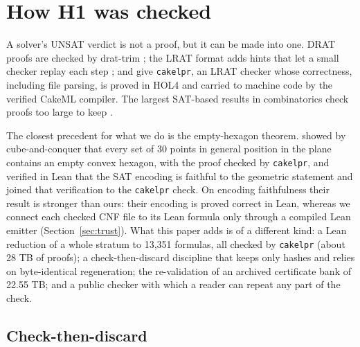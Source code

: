 \documentclass{anvil-paper}
\newcommand{\cakelpr}{\texttt{cake\textunderscore lpr}}
\theoremstyle{definition}
\begin{document}
\section{How H1 was checked}\label{sec:h1}

A solver's UNSAT verdict is not a proof, but it can be made into one. DRAT proofs are checked by drat-trim \citep{wetzler2014drat}; the LRAT format adds hints that let a small checker replay each step \citep{cruzfilipe2017lrat}; and \citet{tan2021cakelpr} give \cakelpr{}, an LRAT checker whose correctness, including file parsing, is proved in HOL4 and carried to machine code by the verified CakeML compiler. The largest SAT-based results in combinatorics check proofs too large to keep \citep{heule2016pythagorean,heule2018schur}.

The closest precedent for what we do is the empty-hexagon theorem. \citet{heule2024hexagon} showed by cube-and-conquer \citep{heule2011cube} that every set of 30 points in general position in the plane contains an empty convex hexagon, with the proof checked by \cakelpr{}, and \citet{subercaseaux2024hexagonlean} verified in Lean that the SAT encoding is faithful to the geometric statement and joined that verification to the \cakelpr{} check. On encoding faithfulness their result is stronger than ours: their encoding is proved correct in Lean, whereas we connect each checked CNF file to its Lean formula only through a compiled Lean emitter (Section~\ref{sec:trust}). What this paper adds is of a different kind: a Lean reduction of a whole stratum to 13,351 formulas, all checked by \cakelpr{} (about 28 TB of proofs); a check-then-discard discipline that keeps only hashes and relies on byte-identical regeneration; the re-validation of an archived certificate bank of 22.55 TB; and a public checker with which a reader can repeat any part of the check.

\subsection{Check-then-discard}\label{sec:method}
\end{document}
